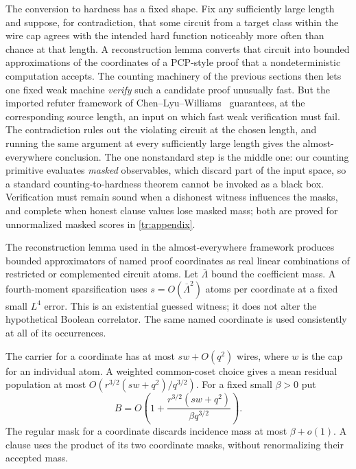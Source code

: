 \documentclass[11pt,letterpaper]{article}
\theoremstyle{definition}
\theoremstyle{remark}
\begin{document}
The conversion to hardness has a fixed shape. Fix any sufficiently
large length and suppose, for contradiction, that some circuit from a
target class within the wire cap agrees with the intended hard
function noticeably more often than chance at that length. A
reconstruction lemma converts that circuit into bounded approximations
of the coordinates of a PCP-style proof that a nondeterministic
computation accepts. The counting machinery of the previous sections
then lets one fixed weak machine \emph{verify} such a candidate proof
unusually fast. But the imported refuter framework of
Chen--Lyu--Williams~\cite{CLW} guarantees, at the corresponding source
length, an input on which fast weak verification must fail. The
contradiction rules out the violating circuit at the chosen length,
and running the same argument at every sufficiently large length gives
the almost-everywhere conclusion. The one nonstandard step is the
middle one: our counting primitive evaluates \emph{masked}
observables, which discard part of the input space, so a standard
counting-to-hardness theorem cannot be invoked as a black box.
Verification must remain sound when a dishonest witness influences
the masks, and complete when honest clause values lose masked mass;
both are proved for unnormalized masked scores in \cref{tr:appendix}.

The reconstruction lemma used in the almost-everywhere framework
produces bounded approximators of named proof coordinates as real
linear combinations of restricted or complemented circuit atoms.
Let $\overline\Lambda$ bound the coefficient mass. A fourth-moment
sparsification uses $s=O(\overline\Lambda^2)$ atoms per coordinate at a
fixed small $L^4$ error. This is an existential guessed witness; it does
not alter the hypothetical Boolean correlator. The same named
coordinate is used consistently at all of its occurrences.

The carrier for a coordinate has at most $s w+O(q^2)$ wires, where
$w$ is the cap for an individual atom. A weighted common-coset choice
gives a mean residual population at most
$O(r^{3/2}(s w+q^2)/q^{3/2})$. For a fixed small $\beta>0$ put
\begin{equation}
B=O\!\left(1+\frac{r^{3/2}(s w+q^2)}{\beta q^{3/2}}\right).
\label{eq:carrier-main}
\end{equation}
The regular mask for a coordinate discards incidence mass at most
$\beta+o(1)$. A clause uses the product of its two coordinate masks,
without renormalizing their accepted mass.
\end{document}
